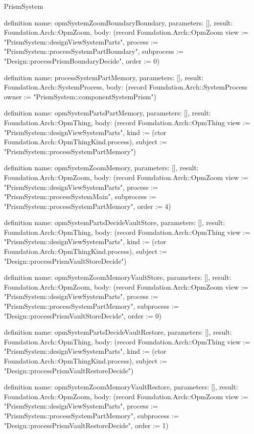 \begin{lexlean}{PrismSystem}
\begin{semanticmodule}
definition{
  name: opmSystemZoomBoundaryBoundary,
  parameters: [],
  result: Foundation.Arch::OpmZoom,
  body: (record Foundation.Arch::OpmZoom {view := "PrismSystem::designViewSystemParts", process := "PrismSystem::processSystemPartBoundary", subprocess := "Design::processPrismBoundaryDecide", order := 0})
}

definition{
  name: processSystemPartMemory,
  parameters: [],
  result: Foundation.Arch::SystemProcess,
  body: (record Foundation.Arch::SystemProcess {owner := "PrismSystem::componentSystemPrism"})
}

definition{
  name: opmSystemPartsPartMemory,
  parameters: [],
  result: Foundation.Arch::OpmThing,
  body: (record Foundation.Arch::OpmThing {view := "PrismSystem::designViewSystemParts", kind := (ctor Foundation.Arch::OpmThingKind.process), subject := "PrismSystem::processSystemPartMemory"})
}

definition{
  name: opmSystemZoomMemory,
  parameters: [],
  result: Foundation.Arch::OpmZoom,
  body: (record Foundation.Arch::OpmZoom {view := "PrismSystem::designViewSystemParts", process := "PrismSystem::processSystemMain", subprocess := "PrismSystem::processSystemPartMemory", order := 4})
}

definition{
  name: opmSystemPartsDecideVaultStore,
  parameters: [],
  result: Foundation.Arch::OpmThing,
  body: (record Foundation.Arch::OpmThing {view := "PrismSystem::designViewSystemParts", kind := (ctor Foundation.Arch::OpmThingKind.process), subject := "Design::processPrismVaultStoreDecide"})
}

definition{
  name: opmSystemZoomMemoryVaultStore,
  parameters: [],
  result: Foundation.Arch::OpmZoom,
  body: (record Foundation.Arch::OpmZoom {view := "PrismSystem::designViewSystemParts", process := "PrismSystem::processSystemPartMemory", subprocess := "Design::processPrismVaultStoreDecide", order := 0})
}

definition{
  name: opmSystemPartsDecideVaultRestore,
  parameters: [],
  result: Foundation.Arch::OpmThing,
  body: (record Foundation.Arch::OpmThing {view := "PrismSystem::designViewSystemParts", kind := (ctor Foundation.Arch::OpmThingKind.process), subject := "Design::processPrismVaultRestoreDecide"})
}

definition{
  name: opmSystemZoomMemoryVaultRestore,
  parameters: [],
  result: Foundation.Arch::OpmZoom,
  body: (record Foundation.Arch::OpmZoom {view := "PrismSystem::designViewSystemParts", process := "PrismSystem::processSystemPartMemory", subprocess := "Design::processPrismVaultRestoreDecide", order := 1})
}


\end{semanticmodule}
\end{lexlean}
